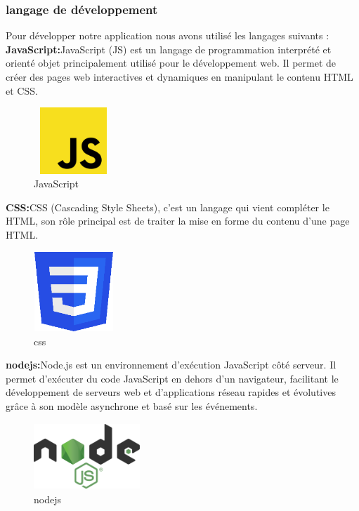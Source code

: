 \documentclass[edit,12pt,a4paper,ChapStyle,oneside,doubleinterligne]{report}
\begin{document}
\subsubsection{langage de développement }
Pour développer notre application nous avons utilisé les langages suivants :
\newline\textbf{JavaScript:}JavaScript (JS) est un langage de programmation interprété et orienté objet principalement utilisé pour le développement web. Il permet de créer des pages web interactives et dynamiques en manipulant le contenu HTML et CSS.\cite{js}
\begin{figure}[H]\label{fig:js}
    \centering
    \includegraphics[width=3cm , height = 2.5cm , angle=360]{images/Javascript.png}
    \caption{JavaScript}
    \end{figure}
\textbf{CSS:}CSS (Cascading Style Sheets), c’est un langage qui vient compléter le HTML, son rôle principal est de traiter la mise en forme du contenu d’une page HTML.\cite{css}
\begin{figure}[H]\label{fig:css}
    \centering
    \includegraphics[width=3cm , height = 3cm , angle=360]{images/css.png}
    \caption{css}
    \end{figure}
\newpage
\textbf{nodejs:}Node.js est un environnement d'exécution JavaScript côté serveur. Il permet d'exécuter du code JavaScript en dehors d'un navigateur, facilitant le développement de serveurs web et d'applications réseau rapides et évolutives grâce à son modèle asynchrone et basé sur les événements.\cite{nodejs}
\begin{figure}[H]\label{fig:nodejs}
    \centering
    \includegraphics[width=4cm , height = 2.5cm , angle=360]{images/nodejs.png}
    \caption{nodejs}
    \end{figure}
\end{document}
